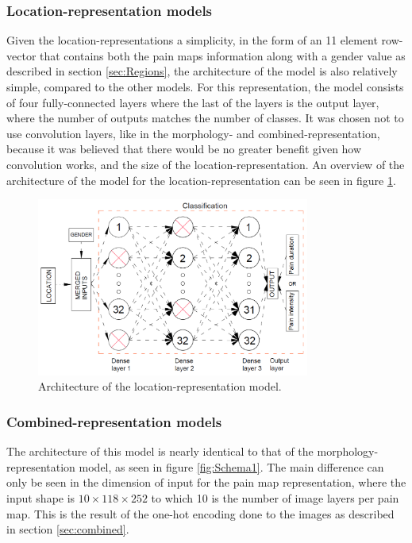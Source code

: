 \subsubsection{Location-representation models}
Given the location-representations a simplicity, in the form of an 11 element row-vector that contains both the pain maps information along with a gender value as described in section \ref{sec:Regions}, the architecture of the model is also relatively simple, compared to the other models. 
For this representation, the model consists of four fully-connected layers where the last of the layers is the output layer, where the number of outputs matches the number of classes.
It was chosen not to use convolution layers, like in the morphology- and combined-representation, because it was believed that there would be no greater benefit given how convolution works, and the size of the location-representation.
An overview of the architecture of the model for the location-representation can be seen in figure \ref{fig:locationar}.

\begin{figure} [H]
\centering
\includegraphics[width=0.8\textwidth]{figures/locationar}
\caption{Architecture of the location-representation model.}
\label{fig:locationar}
\end{figure}

\subsubsection{Combined-representation models}
The architecture of this model is nearly identical to that of the morphology-representation model, as seen in figure \ref{fig:Schema1}.
The main difference can only be seen in the dimension of input for the pain map representation, where the input shape is $10 \times 118 \times 252$ to which 10 is the number of image layers per pain map. This is the result of the one-hot encoding done to the images as described in section \ref{sec:combined}.


